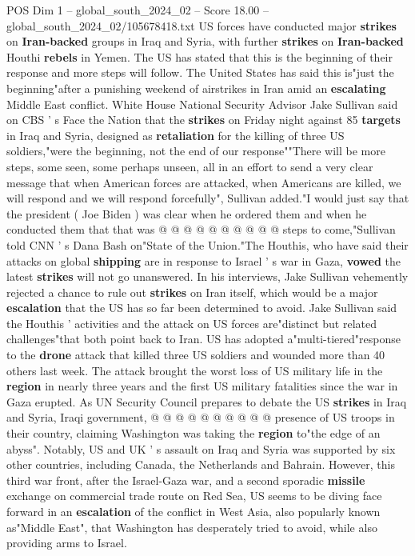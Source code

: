 \begin{textsample}{POS Dim 1 – global\_south\_2024\_02 – Score 18.00 – global\_south\_2024\_02/105678418.txt}  \label{ex:f1_pos_203}
US forces have conducted major \textbf{strikes} on \textbf{Iran-backed} groups in Iraq and Syria, with further \textbf{strikes} on \textbf{Iran-backed} Houthi \textbf{rebels} in Yemen.
The US has stated that this is the beginning of their response and more steps will follow.
The United States has said this is"just the beginning"after a punishing weekend of airstrikes in Iran amid an \textbf{escalating} Middle East conflict.
White House National Security Advisor Jake Sullivan said on CBS ' s Face the Nation that the \textbf{strikes} on Friday night against 85 \textbf{targets} in Iraq and Syria, designed as \textbf{retaliation} for the killing of three US soldiers,"were the beginning, not the end of our response""There will be more steps, some seen, some perhaps unseen, all in an effort to send a very clear message that when American forces are attacked, when Americans are killed, we will respond and we will respond forcefully", Sullivan added."I would just say that the president ( Joe Biden ) was clear when he ordered them and when he conducted them that that was @ @ @ @ @ @ @ @ @ @ steps to come,"Sullivan told CNN ' s Dana Bash on"State of the Union."The Houthis, who have said their attacks on global \textbf{shipping} are in response to Israel ' s war in Gaza, \textbf{vowed} the latest \textbf{strikes} will not go unanswered.
In his interviews, Jake Sullivan vehemently rejected a chance to rule out \textbf{strikes} on Iran itself, which would be a major \textbf{escalation} that the US has so far been determined to avoid.
Jake Sullivan said the Houthis ' activities and the attack on US forces are"distinct but related challenges"that both point back to Iran.
US has adopted a"multi-tiered"response to the \textbf{drone} attack that killed three US soldiers and wounded more than 40 others last week.
The attack brought the worst loss of US military life in the \textbf{region} in nearly three years and the first US military fatalities since the war in Gaza erupted.
As UN Security Council prepares to debate the US \textbf{strikes} in Iraq and Syria, Iraqi government, @ @ @ @ @ @ @ @ @ @ presence of US troops in their country, claiming Washington was taking the \textbf{region} to"the edge of an abyss".
Notably, US and UK ' s assault on Iraq and Syria was supported by six other countries, including Canada, the Netherlands and Bahrain.
However, this third war front, after the Israel-Gaza war, and a second sporadic \textbf{missile} exchange on commercial trade route on Red Sea, US seems to be diving face forward in an \textbf{escalation} of the conflict in West Asia, also popularly known as"Middle East", that Washington has desperately tried to avoid, while also providing arms to Israel.

\end{textsample}
